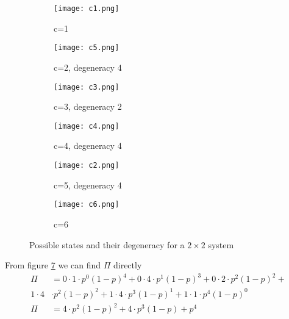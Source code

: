 \documentclass[a4paper,english, 10pt, twoside]{article}
\begin{document}
\begin{figure}[H]
\centering
  \begin{subfigure}[b]{0.3\textwidth}
    \texttt{[image: c1.png]}
    \caption{c=1}
    \label{L2:c1}
  \end{subfigure}
  \begin{subfigure}[b]{0.3\textwidth}
    \texttt{[image: c5.png]}
    \caption{c=2, degeneracy 4}
    \label{L2:c2}
  \end{subfigure}
  \begin{subfigure}[b]{0.3\textwidth}
    \texttt{[image: c3.png]}
    \caption{c=3, degeneracy 2}
    \label{L2:c3}
  \end{subfigure}
  
  \begin{subfigure}[b]{0.3\textwidth}
   \texttt{[image: c4.png]}
   \caption{c=4, degeneracy 4}
   \label{L2:c4}
  \end{subfigure}
  \begin{subfigure}[b]{0.3\textwidth}
   \texttt{[image: c2.png]}
   \caption{c=5, degeneracy 4}
   \label{L2:c5}
  \end{subfigure}
    \begin{subfigure}[b]{0.3\textwidth}
    \texttt{[image: c6.png]}
    \caption{c=6}
    \label{L2:c6}
  \end{subfigure}
  \caption{Possible states and their degeneracy for a $2\times2$ system}
  \label{L2}
\end{figure}
From figure \ref{L2} we can find $\Pi$ directly
\begin{align*}
 \Pi &= 0\cdot1\cdot p^0(1-p)^4 + 0\cdot4\cdot p^1(1-p)^3 + 0\cdot2\cdot p^2(1-p)^2 +\\
 1\cdot4&\cdot p^2(1-p)^2 + 1\cdot4\cdot p^3(1-p)^1 + 1\cdot1\cdot p^4(1-p)^0 \\
 \Pi &=4\cdot p^2(1-p)^2 + 4\cdot p^3(1-p) + p^4
\end{align*}
\end{document}
